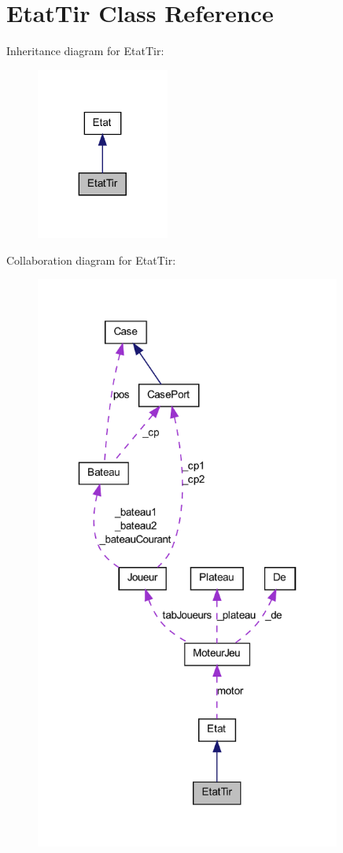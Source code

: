 \hypertarget{class_etat_tir}{
\section{EtatTir Class Reference}
\label{class_etat_tir}
}


Inheritance diagram for EtatTir:
\nopagebreak
\begin{figure}[H]
\begin{center}
\leavevmode
\includegraphics[width=124pt]{class_etat_tir__inherit__graph}
\end{center}
\end{figure}


Collaboration diagram for EtatTir:
\nopagebreak
\begin{figure}[H]
\begin{center}
\leavevmode
\includegraphics[width=285pt]{class_etat_tir__coll__graph}
\end{center}
\end{figure}
